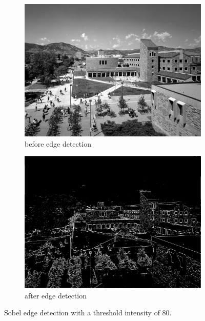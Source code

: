\documentclass[11pt,a4paper]{article}
\begin{document}
\begin{figure}[ht]
	\centering
	\begin{subfigure}[h]{0.7\textwidth}
		\includegraphics[width=\textwidth]{figs/test01_gray}
		\caption{before edge detection}
		\label{fig:test01_gray}
	\end{subfigure}
	
	\begin{subfigure}[h]{0.7\textwidth}
		\includegraphics[width=\textwidth]{figs/test01_edges}
		\caption{after edge detection}
		\label{fig:test01_edge}
	\end{subfigure}
	
	\caption{Sobel edge detection with a threshold intensity of 80.}
	\label{fig:edge01}
\end{figure}
\end{document}

